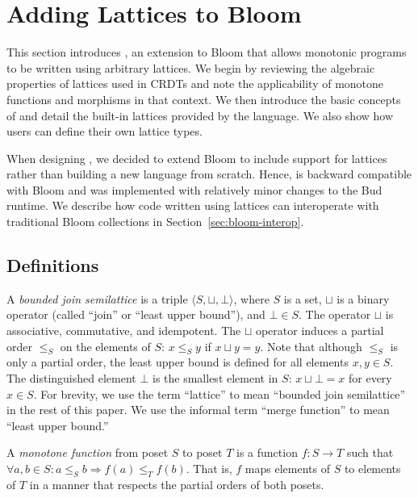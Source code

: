 \section{Adding Lattices to Bloom}
\label{sec:lang}

This section introduces \lang, an extension to Bloom that allows monotonic
programs to be written using arbitrary lattices. We begin by reviewing the
algebraic properties of lattices used in CRDTs and note the applicability of
monotone functions and morphisms in that context. We then introduce the basic
concepts of \lang and detail the built-in lattices provided by the language. We
also show how users can define their own lattice types.

When designing \lang, we decided to extend Bloom to include support for lattices
rather than building a new language from scratch. Hence, \lang is backward
compatible with Bloom and was implemented with relatively minor changes to the
Bud runtime. We describe how code written using lattices can interoperate with
traditional Bloom collections in Section~\ref{sec:bloom-interop}.

\subsection{Definitions}
\label{sec:lattice-defn}
A \emph{bounded join semilattice} is a triple $\langle S, \sqcup, \bot\rangle$,
where $S$ is a set, $\sqcup$ is a binary operator
(called ``join'' or ``least upper bound''), and $\bot \in S$. The operator
$\sqcup$ is associative, commutative, and idempotent. The $\sqcup$ operator induces a partial order $\leq_S$ on the elements of $S$: $x \leq_S y$ if $x \sqcup y = y$.
% 
Note
that although $\leq_S$ is only a partial order, the least upper bound is defined for
all elements $x,y \in S$. The distinguished element $\bot$ is the smallest
element in $S$:  $x \sqcup \bot = x$ for every $x \in S$. For brevity,
we use the term ``lattice'' to mean ``bounded join semilattice'' in the rest of
this paper. We use the informal term ``merge function'' to mean ``least upper
bound.''

A \emph{monotone function} from poset $S$ to poset $T$ is a function $f: S \to
T$ such that $\forall a,b \in S: a \leq_S b \Rightarrow f(a) \leq_T f(b)$. That
is, $f$ maps elements of $S$ to elements of $T$ in a manner that respects the
partial orders of both posets.

